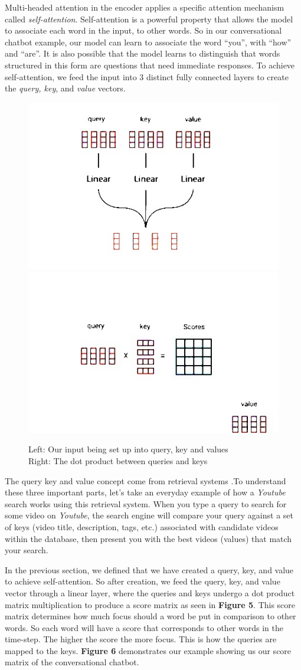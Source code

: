 Multi-headed attention in the encoder applies a specific attention mechanism called \emph{self-attention}. \cite{nine} Self-attention is a powerful property that allows the model to associate each word in the input, to other words. So in our conversational chatbot example, our model can learn to associate the word “you”, with “how” and “are”. It is also possible that the model learns to distinguish that words structured in this form are questions that need immediate responses. To achieve self-attention, we feed the input into 3 distinct fully connected layers to create the \emph{query, key}, and \emph{value} vectors.

\begin{figure}[H]
\centering
\includegraphics[width=.45\textwidth]{figures/t4.jpg}
\includegraphics[width=.45\textwidth]{figures/t5.jpg}
\caption{
Left: Our input being set up into query, key and values\\
Right: The dot product between queries and keys
}
\end{figure}

The query key and value concept come from retrieval systems \cite{twelve}.To understand these three important parts, let's take an everyday example of how a \emph{Youtube} search works using this retrieval system. When you type a query to search for some video on \emph{Youtube}, the search engine will compare your query against a set of keys (video title, description, tags, etc.) associated with candidate videos within the database, then present you with the best videos (values) that match your search. 

In the previous section, we defined that we have created a query, key, and value to achieve self-attention. So after creation, we feed the query, key, and value vector through a linear layer, where the queries and keys undergo a dot product matrix multiplication to produce a score matrix as seen in \textbf{Figure 5}. This score matrix determines how much focus should a word be put in comparison to other words. So each word will have a score that corresponds to other words in the time-step. The higher the score the more focus. This is how the queries are mapped to the keys. \textbf{Figure 6} demonstrates our example showing us our score matrix of the conversational chatbot.


